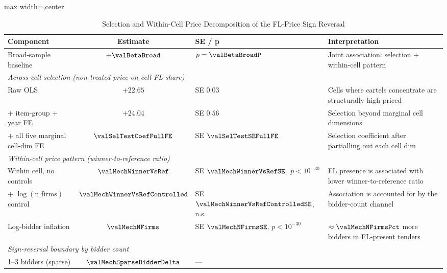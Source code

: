 \begin{table}[htbp]
\centering
\caption{Selection and Within-Cell Price Decomposition of the FL-Price Sign Reversal}
\label{tab:sign_reversal_decomposition_submission}
\footnotesize
\begin{adjustbox}{max width=\textwidth,center}
\begin{threeparttable}
\begin{tabular}{p{4.8cm}cp{2.0cm}p{5.6cm}}
\toprule
Component & Estimate & SE / p & Interpretation \\
\midrule
Broad-sample baseline & $+\valBetaBroad$ & $p=\valBetaBroadP$ &
  Joint association: selection $+$ within-cell pattern \\
\midrule
\multicolumn{4}{l}{\textit{Across-cell selection (non-treated price on cell FL-share)}} \\
\hspace{6pt} Raw OLS & $+22.65$ & SE $0.03$ &
  Cells where cartels concentrate are structurally high-priced \\
\hspace{6pt} + item-group + year FE & $+24.04$ & SE $0.56$ &
  Selection beyond marginal cell dimensions \\
\hspace{6pt} + all five marginal cell-dim FE & $\valSelTestCoefFullFE$ &
  SE $\valSelTestSEFullFE$ &
  Selection coefficient after partialling out each cell dim \\
\midrule
\multicolumn{4}{l}{\textit{Within-cell price pattern (winner-to-reference ratio)}} \\
\hspace{6pt} Within cell, no controls & $\valMechWinnerVsRef$ &
  SE $\valMechWinnerVsRefSE$, $p<10^{-30}$ &
  FL presence is associated with lower winner-to-reference ratio \\
\hspace{6pt} + $\log(\text{n\_firms})$ control & $\valMechWinnerVsRefControlled$ &
  SE $\valMechWinnerVsRefControlledSE$, n.s. &
  Association is accounted for by the bidder-count channel \\
\hspace{6pt} Log-bidder inflation & $\valMechNFirms$ &
  SE $\valMechNFirmsSE$, $p<10^{-30}$ &
  $\approx \valMechNFirmsPct$ more bidders in FL-present tenders \\
\midrule
\multicolumn{4}{l}{\textit{Sign-reversal boundary by bidder count}} \\
\hspace{6pt} 1--3 bidders (sparse) & $\valMechSparseBidderDelta$ & --- &

\end{tabular}
\end{threeparttable}
\end{adjustbox}
\end{table}
